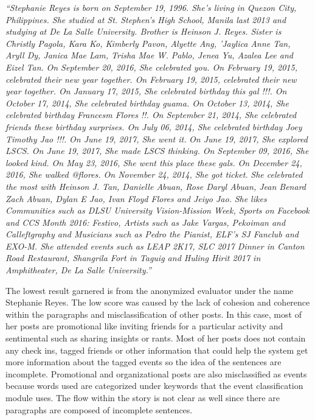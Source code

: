 \textit{“Stephanie Reyes is born on September 19, 1996. She's living in Quezon City, Philippines. She studied at St. Stephen's High School, Manila last 2013 and studying at De La Salle University. Brother is Heinson J. Reyes. Sister is Christly Pagola, Kara Ko, Kimberly Pavon, Alyette Ang, 'Jaylica Anne Tan, Aryll Dy, Janica Mae Lam, Trisha Mae W. Pablo, Jenea Yu, Azalea Lee and Eizel Tan.}
 \newline
\textit{On September 20, 2016, She celebrated you. On February 19, 2015, celebrated their new year together. On February 19, 2015, celebrated their new year together. On January 17, 2015, She celebrated birthday this gal !!!. On October 17, 2014, She celebrated birthday guama. On October 13, 2014, She celebrated birthday Francesm Flores !!. On September 21, 2014, She celebrated friends these birthday surprises. On July 06, 2014, She celebrated birthday Joey Timothy Jao !!!.}
 \newline
\textit{On June 19, 2017, She went it.}
 \newline
\textit{On June 19, 2017, She explored LSCS. On June 19, 2017, She made LSCS thinking. On September 09, 2016, She looked kind. On May 23, 2016, She went this place these gals. On December 24, 2016, She walked @flores. On November 24, 2014, She got ticket.}
 \newline
\textit{She celebrated the most with Heinson J. Tan, Danielle Abuan, Rose Daryl Abuan, Jean Benard Zach Abuan, Dylan E Jao, Ivan Floyd Flores and Jeiyo Jao.}
\newline
\textit{She likes Communities such as DLSU University Vision-Mission Week, Sports on Facebook and CCS Month 2016: Festivo, Artists such as Jake Vargas, Pekoiman and Calleftgraphy and Musicians such as Pedro the Pianist, ELF's SJ Fanclub and EXO-M. She attended events such as LEAP 2K17, SLC 2017 Dinner in Canton Road Restaurant, Shangrila Fort in Taguig and Huling Hirit 2017 in Amphitheater, De La Salle University.”}

The lowest result garnered is from the anonymized evaluator under the name Stephanie Reyes. The low score was caused by the lack of cohesion and coherence within the paragraphs and misclassification of other posts. In this case, most of her posts are promotional like inviting friends for a particular activity and sentimental such as sharing insights or rants. Most of her posts does not contain any check ins, tagged friends or other information that could help the system get more information about the tagged events so the idea of the sentences are incomplete. Promotional and organizational posts are also misclassified as events because words used are categorized under keywords that the event classification module uses. The flow within the story is not clear as well since there are paragraphs are composed of incomplete sentences.

